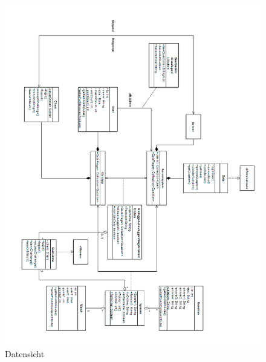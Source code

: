 \begin{figure}[H]
	\centering
	\begin{minipage}[t]{\textwidth}
		\includegraphics[width=1\textwidth]{Diagramme/DatensichtPaint.png}
		\caption{Datensicht}
		\label{Datensicht}
	\end{minipage}
\end{figure}